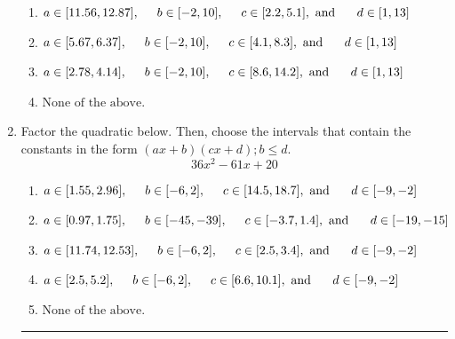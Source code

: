 \documentclass[14pt]{extbook}
\newcommand{\litem}[1]{\item#1\hspace*{-1cm}\rule{\textwidth}{0.4pt}}
\begin{document}
\begin{enumerate}
{\begin{enumerate}[label=\Alph*.]
\item \( a \in [11.56, 12.87], \hspace*{5mm} b \in [-2, 10], \hspace*{5mm} c \in [2.2, 5.1], \text{ and } \hspace*{5mm} d \in [1, 13] \)
\item \( a \in [5.67, 6.37], \hspace*{5mm} b \in [-2, 10], \hspace*{5mm} c \in [4.1, 8.3], \text{ and } \hspace*{5mm} d \in [1, 13] \)
\item \( a \in [2.78, 4.14], \hspace*{5mm} b \in [-2, 10], \hspace*{5mm} c \in [8.6, 14.2], \text{ and } \hspace*{5mm} d \in [1, 13] \)
\item \( \text{None of the above.} \)

\end{enumerate} }
\litem{
Factor the quadratic below. Then, choose the intervals that contain the constants in the form $(ax+b)(cx+d); b \leq d.$\[ 36x^{2} -61 x + 20 \]\begin{enumerate}[label=\Alph*.]
\item \( a \in [1.55, 2.96], \hspace*{5mm} b \in [-6, 2], \hspace*{5mm} c \in [14.5, 18.7], \text{ and } \hspace*{5mm} d \in [-9, -2] \)
\item \( a \in [0.97, 1.75], \hspace*{5mm} b \in [-45, -39], \hspace*{5mm} c \in [-3.7, 1.4], \text{ and } \hspace*{5mm} d \in [-19, -15] \)
\item \( a \in [11.74, 12.53], \hspace*{5mm} b \in [-6, 2], \hspace*{5mm} c \in [2.5, 3.4], \text{ and } \hspace*{5mm} d \in [-9, -2] \)
\item \( a \in [2.5, 5.2], \hspace*{5mm} b \in [-6, 2], \hspace*{5mm} c \in [6.6, 10.1], \text{ and } \hspace*{5mm} d \in [-9, -2] \)
\item \( \text{None of the above.} \)


\end{enumerate}}
\end{enumerate}
\end{document}
